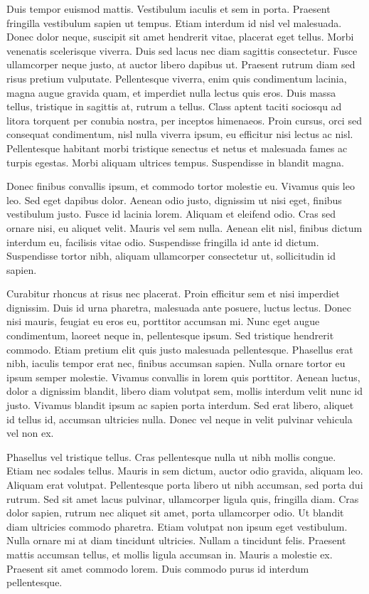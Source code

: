 \documentclass{homework}
\begin{document}
Duis tempor euismod mattis. Vestibulum iaculis et sem in porta. Praesent fringilla vestibulum sapien ut tempus. Etiam interdum id nisl vel malesuada. Donec dolor neque, suscipit sit amet hendrerit vitae, placerat eget tellus. Morbi venenatis scelerisque viverra. Duis sed lacus nec diam sagittis consectetur. Fusce ullamcorper neque justo, at auctor libero dapibus ut. Praesent rutrum diam sed risus pretium vulputate. Pellentesque viverra, enim quis condimentum lacinia, magna augue gravida quam, et imperdiet nulla lectus quis eros. Duis massa tellus, tristique in sagittis at, rutrum a tellus. Class aptent taciti sociosqu ad litora torquent per conubia nostra, per inceptos himenaeos. Proin cursus, orci sed consequat condimentum, nisl nulla viverra ipsum, eu efficitur nisi lectus ac nisl. Pellentesque habitant morbi tristique senectus et netus et malesuada fames ac turpis egestas. Morbi aliquam ultrices tempus. Suspendisse in blandit magna.

Donec finibus convallis ipsum, et commodo tortor molestie eu. Vivamus quis leo leo. Sed eget dapibus dolor. Aenean odio justo, dignissim ut nisi eget, finibus vestibulum justo. Fusce id lacinia lorem. Aliquam et eleifend odio. Cras sed ornare nisi, eu aliquet velit. Mauris vel sem nulla. Aenean elit nisl, finibus dictum interdum eu, facilisis vitae odio. Suspendisse fringilla id ante id dictum. Suspendisse tortor nibh, aliquam ullamcorper consectetur ut, sollicitudin id sapien.

Curabitur rhoncus at risus nec placerat. Proin efficitur sem et nisi imperdiet dignissim. Duis id urna pharetra, malesuada ante posuere, luctus lectus. Donec nisi mauris, feugiat eu eros eu, porttitor accumsan mi. Nunc eget augue condimentum, laoreet neque in, pellentesque ipsum. Sed tristique hendrerit commodo. Etiam pretium elit quis justo malesuada pellentesque. Phasellus erat nibh, iaculis tempor erat nec, finibus accumsan sapien. Nulla ornare tortor eu ipsum semper molestie. Vivamus convallis in lorem quis porttitor. Aenean luctus, dolor a dignissim blandit, libero diam volutpat sem, mollis interdum velit nunc id justo. Vivamus blandit ipsum ac sapien porta interdum. Sed erat libero, aliquet id tellus id, accumsan ultricies nulla. Donec vel neque in velit pulvinar vehicula vel non ex.

Phasellus vel tristique tellus. Cras pellentesque nulla ut nibh mollis congue. Etiam nec sodales tellus. Mauris in sem dictum, auctor odio gravida, aliquam leo. Aliquam erat volutpat. Pellentesque porta libero ut nibh accumsan, sed porta dui rutrum. Sed sit amet lacus pulvinar, ullamcorper ligula quis, fringilla diam. Cras dolor sapien, rutrum nec aliquet sit amet, porta ullamcorper odio. Ut blandit diam ultricies commodo pharetra. Etiam volutpat non ipsum eget vestibulum. Nulla ornare mi at diam tincidunt ultricies. Nullam a tincidunt felis. Praesent mattis accumsan tellus, et mollis ligula accumsan in. Mauris a molestie ex. Praesent sit amet commodo lorem. Duis commodo purus id interdum pellentesque.
\end{document}

